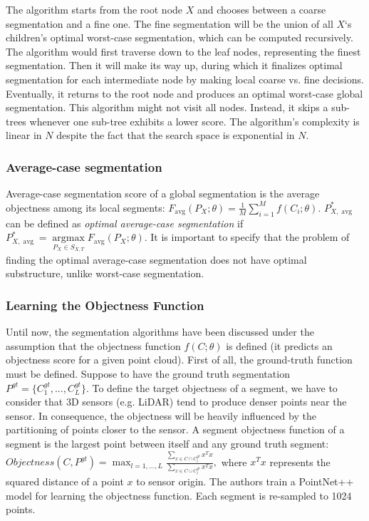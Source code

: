 The algorithm starts from the root node $X$ and chooses between a
coarse segmentation and a fine one. The fine segmentation will be the
union of all $X$`s children's optimal worst-case segmentation, which
can be computed recursively. The algorithm would first traverse down to
the leaf nodes, representing the finest segmentation. Then it will make
its way up, during which it finalizes optimal segmentation for each
intermediate node by making local coarse vs. fine decisions. Eventually,
it returns to the root node and produces an optimal worst-case global
segmentation. This algorithm might not visit all nodes. Instead, it
skips a sub-trees whenever one sub-tree exhibits a lower score. The
algorithm's complexity is linear in $N$ despite the fact that the
search space is exponential in $N$.

\subsubsection{Average-case segmentation}\label{header-n892}

Average-case segmentation score of a global segmentation is the average
objectness among its local segments:
\newline
$ F_{\operatorname{avg}{}}(P_X; \theta) = \frac{1}{M} \sum _{i=1}^M f(C_i; \theta).$
\newline
$P_{X,\operatorname{avg}{}}^*$ can be defined as \emph{optimal
average-case segmentation} if
\newline
$ P_{X,\operatorname{avg}{}}^* = \mathop{\operatorname{argmax}}\limits_{P_X\in S_{X,T}} {F_{\operatorname{avg}{}} (P_X; \theta)}. $
\newline
It is important to specify that the problem of finding the optimal
average-case segmentation does not have optimal substructure, unlike
worst-case segmentation.

\subsubsection{Learning the Objectness Function}\label{header-n898}

Until now, the segmentation algorithms have been discussed under the
assumption that the objectness function $f(C; \theta)$ is defined (it
predicts an objectness score for a given point cloud). First of all, the
ground-truth function must be defined. Suppose to have the ground truth
segmentation $P^{gt} = \{C_1^{gt},...,C_L^{gt}\}$. To define the
target objectness of a segment, we have to consider that 3D sensors
(e.g. LiDAR) tend to produce denser points near the sensor. In
consequence, the objectness will be heavily influenced by the
partitioning of points closer to the sensor. A segment objectness
function of a segment is the largest point between itself and any ground
truth segment:
\newline
$ Objectness(C, P^{gt}) = \max _{l=1,\ldots,L} \frac{\sum _{x \in C \cap C^{gt}_l} x^T x }{\sum _{x \in C \cup C^{gt}_l} x^T x }, $
\newline
where $x^T x$ represents the squared distance of a point $x$ to
sensor origin. The authors train a PointNet++ model for learning the
objectness function. Each segment is re-sampled to 1024 points.

